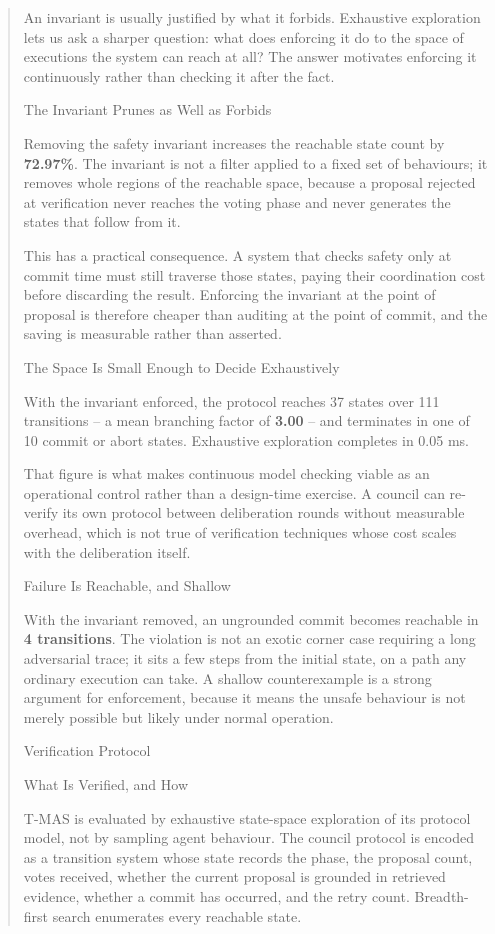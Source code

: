 \documentclass[manuscript,review]{acmart}
\begin{document}
\begin{quote}
{An invariant is usually justified by what it forbids. Exhaustive exploration lets
us ask a sharper question: what does enforcing it do to the space of executions the
system can reach at all? The answer motivates enforcing it continuously rather than
checking it after the fact.

 The Invariant Prunes as Well as Forbids

Removing the safety invariant increases the reachable state count by
\textbf{72.97\%}. The invariant is not a filter
applied to a fixed set of behaviours; it removes whole regions of the reachable
space, because a proposal rejected at verification never reaches the voting phase
and never generates the states that follow from it.

This has a practical consequence. A system that checks safety only at commit time
must still traverse those states, paying their coordination cost before discarding
the result. Enforcing the invariant at the point of proposal is therefore cheaper
than auditing at the point of commit, and the saving is measurable rather than
asserted.

 The Space Is Small Enough to Decide Exhaustively

With the invariant enforced, the protocol reaches
37 states over 111
transitions -- a mean branching factor of
\textbf{3.00} -- and terminates in one of
10 commit or abort states. Exhaustive exploration
completes in 0.05 ms.

That figure is what makes continuous model checking viable as an operational
control rather than a design-time exercise. A council can re-verify its own
protocol between deliberation rounds without measurable overhead, which is not true
of verification techniques whose cost scales with the deliberation itself.

 Failure Is Reachable, and Shallow

With the invariant removed, an ungrounded commit becomes reachable in
\textbf{4 transitions}. The violation is
not an exotic corner case requiring a long adversarial trace; it sits a few steps
from the initial state, on a path any ordinary execution can take. A shallow
counterexample is a strong argument for enforcement, because it means the unsafe
behaviour is not merely possible but likely under normal operation.



 Verification Protocol

 What Is Verified, and How

T-MAS is evaluated by exhaustive state-space exploration of its protocol model, not by sampling agent behaviour. The council protocol is encoded as a transition system whose state records the phase, the proposal count, votes received, whether the current proposal is grounded in retrieved evidence, whether a commit has occurred, and the retry count. Breadth-first search enumerates every reachable state.

}
\end{quote}
\end{document}
